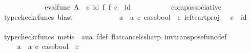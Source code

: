 \begin{isabellebody}
\ \ \ \ \ \ \ \isamarkupfalse%
\ \isamarkupfalse%
\ {\isachardoublequoteopen}{\isachardot}{\kern0pt}{\isachardot}{\kern0pt}{\isachardot}{\kern0pt}\ {\isacharequal}{\kern0pt}\ {\isacharparenleft}{\kern0pt}eval{\isacharunderscore}{\kern0pt}func\ A\ {\isasymOmega}\ {\isasymcirc}\isactrlsub c\ {\isacharparenleft}{\kern0pt}id{\isacharparenleft}{\kern0pt}{\isasymOmega}{\isacharparenright}{\kern0pt}\ {\isasymtimes}\isactrlsub f\ f{\isacharparenright}{\kern0pt}{\isacharparenright}{\kern0pt}\ {\isasymcirc}\isactrlsub c\ {\isasymlangle}{\isasymt}{\isacharcomma}{\kern0pt}\ id{\isacharparenleft}{\kern0pt}{\isasymone}{\isacharparenright}{\kern0pt}{\isasymrangle}{\isachardoublequoteclose}\isanewline
\ \ \ \ \ \ \ \ \ \isamarkupfalse%
\ comp{\isacharunderscore}{\kern0pt}associative{}\ \isamarkupfalse%
\ {\isacharparenleft}{\kern0pt}typecheck{\isacharunderscore}{\kern0pt}cfuncs{\isacharcomma}{\kern0pt}\ blast{\isacharparenright}{\kern0pt}\isanewline
\ \ \ \ \ \ \ \isamarkupfalse%
\ \isamarkupfalse%
\ {\isachardoublequoteopen}{\isachardot}{\kern0pt}{\isachardot}{\kern0pt}{\isachardot}{\kern0pt}\ {\isacharequal}{\kern0pt}\ {\isacharparenleft}{\kern0pt}{\isacharparenleft}{\kern0pt}a{}\ {\isasymamalg}\ a{}{\isacharparenright}{\kern0pt}\ {\isasymcirc}\isactrlsub c\ case{\isacharunderscore}{\kern0pt}bool\ \ {\isasymcirc}\isactrlsub c\ left{\isacharunderscore}{\kern0pt}cart{\isacharunderscore}{\kern0pt}proj\ {\isasymOmega}\ {\isasymone}{\isacharparenright}{\kern0pt}\ {\isasymcirc}\isactrlsub c\ {\isasymlangle}{\isasymt}{\isacharcomma}{\kern0pt}\ id{\isacharparenleft}{\kern0pt}{\isasymone}{\isacharparenright}{\kern0pt}{\isasymrangle}{\isachardoublequoteclose}\isanewline
\ \ \ \ \ \ \ \ \ \isamarkupfalse%
\ {\isacharparenleft}{\kern0pt}typecheck{\isacharunderscore}{\kern0pt}cfuncs{\isacharcomma}{\kern0pt}\ metis\ \ aua\ f{\isacharunderscore}{\kern0pt}def\ flat{\isacharunderscore}{\kern0pt}cancels{\isacharunderscore}{\kern0pt}sharp\ inv{\isacharunderscore}{\kern0pt}transpose{\isacharunderscore}{\kern0pt}func{\isacharunderscore}{\kern0pt}def{}{\isacharparenright}{\kern0pt}\isanewline
\ \ \ \ \ \ \ \isamarkupfalse%
\ \isamarkupfalse%
\ {\isachardoublequoteopen}{\isachardot}{\kern0pt}{\isachardot}{\kern0pt}{\isachardot}{\kern0pt}\ {\isacharequal}{\kern0pt}\ {\isacharparenleft}{\kern0pt}a{}\ {\isasymamalg}\ a{}{\isacharparenright}{\kern0pt}\ {\isasymcirc}\isactrlsub c\ case{\isacharunderscore}{\kern0pt}bool\ \ {\isasymcirc}\isactrlsub c\ {\isasymt}{\isachardoublequoteclose}\isanewline

\end{isabellebody}
